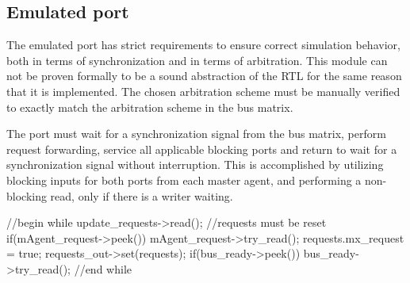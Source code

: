 \subsection{Emulated port}
\label{sub:portem}
The emulated port has strict requirements to ensure correct simulation behavior, both in terms of synchronization and in terms of arbitration. This module can not be proven formally to be a sound abstraction of the RTL for the same reason that it is implemented. The chosen arbitration scheme must be manually verified to exactly match the arbitration scheme in the bus matrix. \par {} 
The port must wait for a synchronization signal from the bus matrix, perform request forwarding, service all applicable blocking ports and return to wait for a synchronization signal without interruption. This is accomplished by utilizing blocking inputs for both ports from each master agent, and performing a non-blocking read, only if there is a writer waiting. 

\begin{C++}
//begin while
update_requests->read(); 
//requests must be reset 
if(mAgent_request->peek()){
mAgent_request->try_read();
requests.mx_request = true;
}
requests_out->set(requests); 
if(bus_ready->peek()) bus_ready->try_read();
//end while
\end{C++}



